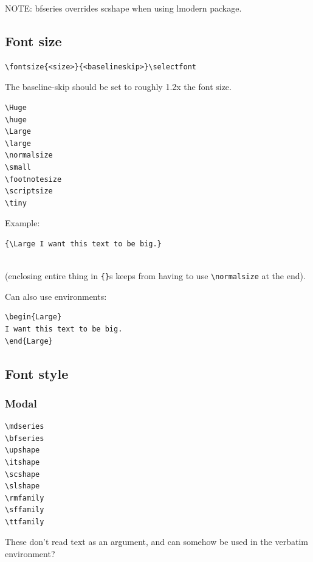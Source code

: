 \documentclass{article}
\begin{document}
NOTE: bfseries overrides scshape when using lmodern package.

\subsection{Font size}

\begin{lstlisting}
\fontsize{<size>}{<baselineskip>}\selectfont
\end{lstlisting}

The baseline-skip should be set to roughly 1.2x the font size.

\begin{minipage}[t]{0.3\textwidth}
\begin{lstlisting}
\Huge
\huge
\Large
\large
\normalsize
\small
\footnotesize
\scriptsize
\tiny
\end{lstlisting}
\end{minipage}%
\begin{minipage}[t]{0.7\textwidth}
    Example:
\begin{lstlisting}
{\Large I want this text to be big.}
\end{lstlisting}
    \vspace{-2ex}{\Large I want this text to be big.}\\
(enclosing entire thing in \verb|{}|s keeps from having to use
\verb|\normalsize| at the end).

Can also use environments:
\begin{lstlisting}
\begin{Large}
I want this text to be big.
\end{Large}
\end{lstlisting}
\end{minipage}

\subsection{Font style}
\subsubsection{Modal}

\begin{minipage}[t]{0.5\textwidth}
\begin{lstlisting}
\mdseries
\bfseries
\upshape
\itshape
\scshape
\slshape
\rmfamily
\sffamily
\ttfamily
\end{lstlisting}
\end{minipage}%
\begin{minipage}[t]{0.5\textwidth}
    These don't read text as an argument, and can somehow be
    used in the verbatim environment?
\end{minipage}
\end{document}
